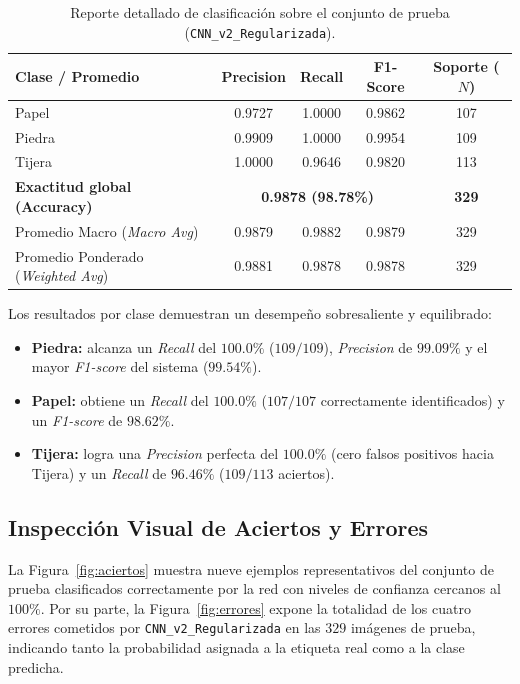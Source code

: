 \begin{table}[H]
    \centering
    \caption{Reporte detallado de clasificación sobre el conjunto de prueba (\texttt{CNN\_v2\_Regularizada}).}
    \label{tab:reporte_clasificacion}
    \begin{tabular}{lcccc}
        \toprule
        \textbf{Clase / Promedio} & \textbf{Precision} & \textbf{Recall} & \textbf{F1-Score} & \textbf{Soporte ($N$)} \\
        \midrule
        Papel  & 0.9727 & 1.0000 & 0.9862 & 107 \\
        Piedra & 0.9909 & 1.0000 & 0.9954 & 109 \\
        Tijera & 1.0000 & 0.9646 & 0.9820 & 113 \\
        \midrule
        \textbf{Exactitud global (Accuracy)} & \multicolumn{3}{c}{\textbf{0.9878 (98.78\%)}} & \textbf{329} \\
        Promedio Macro (\textit{Macro Avg}) & 0.9879 & 0.9882 & 0.9879 & 329 \\
        Promedio Ponderado (\textit{Weighted Avg}) & 0.9881 & 0.9878 & 0.9878 & 329 \\
        \bottomrule
    \end{tabular}
\end{table}

Los resultados por clase demuestran un desempeño sobresaliente y equilibrado:
\begin{itemize}
    \item \textbf{Piedra:} alcanza un \textit{Recall} del $100.0\%$ ($109/109$), \textit{Precision} de $99.09\%$ y el mayor \textit{F1-score} del sistema ($99.54\%$).
    \item \textbf{Papel:} obtiene un \textit{Recall} del $100.0\%$ ($107/107$ correctamente identificados) y un \textit{F1-score} de $98.62\%$.
    \item \textbf{Tijera:} logra una \textit{Precision} perfecta del $100.0\%$ (cero falsos positivos hacia Tijera) y un \textit{Recall} de $96.46\%$ ($109/113$ aciertos).
\end{itemize}

\subsection{Inspección Visual de Aciertos y Errores}

La Figura~\ref{fig:aciertos} muestra nueve ejemplos representativos del conjunto de prueba clasificados correctamente por la red con niveles de confianza cercanos al $100\%$. Por su parte, la Figura~\ref{fig:errores} expone la totalidad de los cuatro errores cometidos por \texttt{CNN\_v2\_Regularizada} en las $329$ imágenes de prueba, indicando tanto la probabilidad asignada a la etiqueta real como a la clase predicha.

